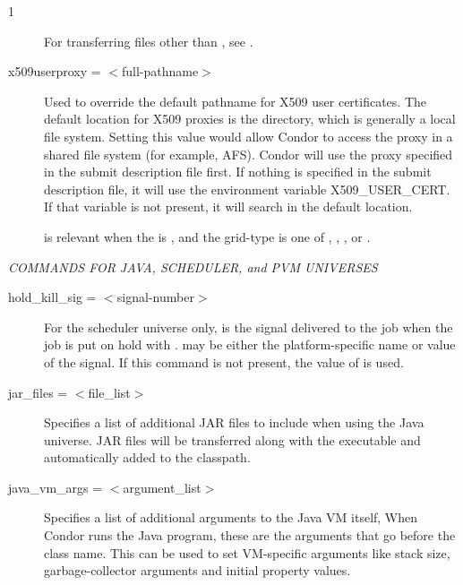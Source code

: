 \begin{ManPage}{\label{man-condor-submit}}{1}
\begin{description}
For transferring files other than ,
see .


\item[x509userproxy = $<$full-pathname$>$] Used to override the default
pathname for X509 user certificates. The default location for X509 proxies
is the  directory,
which is generally a local file system.
Setting
this value would allow Condor to access the proxy in a shared file system
(for example, AFS).
Condor will use the proxy specified in the submit description file first.
If nothing is specified in the submit description file,
it will use the environment variable X509\_USER\_CERT.
If that variable is not present,
it will search in the default location.

 is relevant when
the  is ,
and the grid-type is one of , ,
, or .

\end{description} 


\emph{COMMANDS FOR JAVA, SCHEDULER, and PVM UNIVERSES}
\begin{description} 


\item[hold\_kill\_sig = $<$signal-number$>$] For the scheduler universe only,
 is the signal delivered
to the job when the job is put on hold
with .
 may be either the platform-specific name or value
of the signal.
If this command is not present,
the value of  is used.



\item[jar\_files = $<$file\_list$>$]
Specifies a list of additional JAR files to include when using
the Java universe.  JAR files will be transferred along with
the executable and automatically added to the classpath.


\item[java\_vm\_args = $<$argument\_list$>$]
Specifies a list of additional arguments to the Java VM itself,
When Condor runs the Java program, these are the arguments that 
go before the class name.  This can be used to set VM-specific 
arguments like stack size, garbage-collector arguments 
and initial property values.


\end{description}
\end{ManPage}
